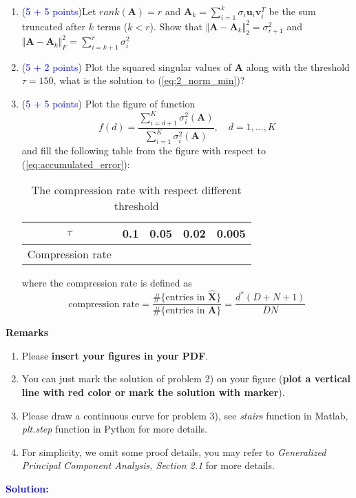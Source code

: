 \documentclass[english,onecolumn]{IEEEtran}
\begin{document}
\begin{enumerate}
    \item (\textcolor{blue}{5 + 5 points})Let $rank(\mathbf{A}) = r$ and $\mathbf{A}_k = \sum\limits_{i = 1}^{k} \sigma_i \mathbf{u}_i\mathbf{v}_i^T$ be the sum truncated after $k$ terms ($k<r$). Show that $\Vert \mathbf{A} - \mathbf{A}_k \Vert_2^2 = \sigma_{r+1}^2 $  and $\Vert \mathbf{A} - \mathbf{A}_k \Vert_F^2 = \sum\limits_{i=k+1}^r\sigma_{i}^2 $
    \item (\textcolor{blue}{5 + 2 points}) Plot the squared singular values of $\mathbf{A}$  along with the threshold $\tau=150$, what is the solution to (\ref{eq:2_norm_min})?
    \item (\textcolor{blue}{5 + 5 points}) Plot the figure of function 
    \begin{equation}
        f(d)=\frac{\sum_{i=d+1}^K\sigma_{i}^2(\mathbf{A})}{\sum_{i=1}^K\sigma_i^2(\mathbf{A})},\quad d=1,\dots,K
    \end{equation}
    and fill the following table from the figure with respect to (\ref{eq:accumulated_error}):
    \begin{table}[htb]
    \caption{The compression rate with respect different threshold}
    \centering
    \begin{tabular}{|l|l|l|l|l|}
    \hline
    \multicolumn{1}{|c|}{$\tau$} & 0.1 & 0.05 & 0.02 & 0.005 \\ \hline
    Compression rate             &   &    &   &  \\ \hline
    \end{tabular}
    \end{table}
    
    where the compression rate is defined as 
    \begin{equation}
        \text{compression rate}=\frac{\#\{\text{entries in } \hat{\mathbf{X}}\}}{\#\{\text{entries in } \mathbf{A}\}}=\frac{d^*(D+N+1)}{DN}
    \end{equation}
\end{enumerate}


{\bf Remarks}
\begin{enumerate}
    \item Please \textbf{insert your figures in your PDF}.
    \item You can just mark the solution of problem 2) on your figure (\textbf{plot a vertical line with red color or mark the solution with marker}).
    \item Please draw a continuous curve for problem 3), see \textit{stairs} function in Matlab, \textit{plt.step} function in Python for more details.
    \item For simplicity, we omit some proof details, you may refer to \textit{Generalized Principal Component Analysis, Section 2.1} for more details.
\end{enumerate}
\noindent\textcolor{blue}{
	\textbf{Solution:}
	}
\newpage
\end{document}
